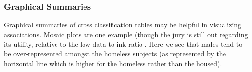 \begin{knitrout}
\end{knitrout}



\subsubsection{Graphical Summaries}

Graphical summaries of cross classification tables may be helpful in visualizing
associations.  Mosaic plots are one example (though the jury is still out
regarding its utility, relative to the low data to ink ratio \cite{Tufte:2001:Visual}.  
Here we see that males tend to be over-represented
amongst the homeless subjects (as represented by the horizontal line which is higher for
the homeless rather than the housed).  


